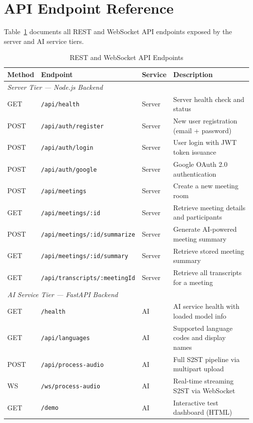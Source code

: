 \documentclass[conference]{IEEEtran}
\begin{document}
\section{API Endpoint Reference}

Table~\ref{tab:endpoints} documents all REST and WebSocket API endpoints exposed by the server and AI service tiers.

\begin{table}[htbp]
\centering
\caption{REST and WebSocket API Endpoints}
\label{tab:endpoints}
\renewcommand{\arraystretch}{1.2}
{\small
\begin{tabular}{@{} l l l l @{}}
\toprule
\textbf{Method} & \textbf{Endpoint} & \textbf{Service} & \textbf{Description} \\
\midrule
\multicolumn{4}{l}{\textit{Server Tier --- Node.js Backend}} \\
\midrule
GET  & \texttt{/api/health}               & Server  & Server health check and status \\
POST & \texttt{/api/auth/register}         & Server  & New user registration (email + password) \\
POST & \texttt{/api/auth/login}            & Server  & User login with JWT token issuance \\
POST & \texttt{/api/auth/google}           & Server  & Google OAuth 2.0 authentication \\
POST & \texttt{/api/meetings}              & Server  & Create a new meeting room \\
GET  & \texttt{/api/meetings/:id}          & Server  & Retrieve meeting details and participants \\
POST & \texttt{/api/meetings/:id/summarize}& Server  & Generate AI-powered meeting summary \\
GET  & \texttt{/api/meetings/:id/summary}  & Server  & Retrieve stored meeting summary \\
GET  & \texttt{/api/transcripts/:meetingId}& Server  & Retrieve all transcripts for a meeting \\
\midrule
\multicolumn{4}{l}{\textit{AI Service Tier --- FastAPI Backend}} \\
\midrule
GET  & \texttt{/health}                    & AI      & AI service health with loaded model info \\
GET  & \texttt{/api/languages}             & AI      & Supported language codes and display names \\
POST & \texttt{/api/process-audio}         & AI      & Full S2ST pipeline via multipart upload \\
WS   & \texttt{/ws/process-audio}          & AI      & Real-time streaming S2ST via WebSocket \\
GET  & \texttt{/demo}                      & AI      & Interactive test dashboard (HTML) \\
\bottomrule
\end{tabular}
}
\end{table}
\end{document}
